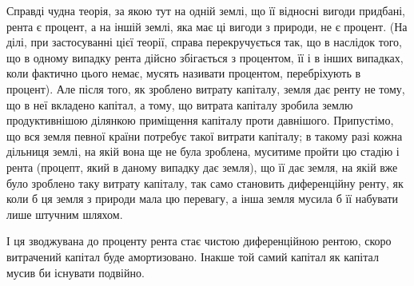 Справді чудна теорія, за якою тут на одній землі, що її відносні вигоди
придбані, рента є процент, а на іншій землі, яка має ці вигоди з природи, не
є процент. (На ділі, при застосуванні цієї теорії, справа перекручується так, що в
наслідок того, що в одному випадку рента дійсно збігається з процентом, її і в інших
випадках, коли фактично цього немає, мусять називати процентом, перебріхують
в процент). Але після того, як зроблено витрату капіталу, земля дає ренту не тому,
що в неї вкладено капітал, а тому, що витрата капіталу зробила землю продуктивнішою
ділянкою приміщення капіталу проти давнішого. Припустімо,
що вся земля певної країни потребує такої витрати капіталу; в такому разі
кожна дільниця землі, на якій вона ще не була зроблена, муситиме пройти цю
стадію і рента (процепт, який в даному випадку дає земля), що її дає земля, на
якій вже було зроблено таку витрату капіталу, так само становить диференційну
ренту, як коли б ця земля з природи мала цю перевагу, а інша земля
мусила б її набувати лише штучним шляхом.

І ця зводжувана до проценту рента стає чистою диференційною рентою,
скоро витрачений капітал буде амортизовано. Інакше той самий капітал як
капітал мусив би існувати подвійно.
